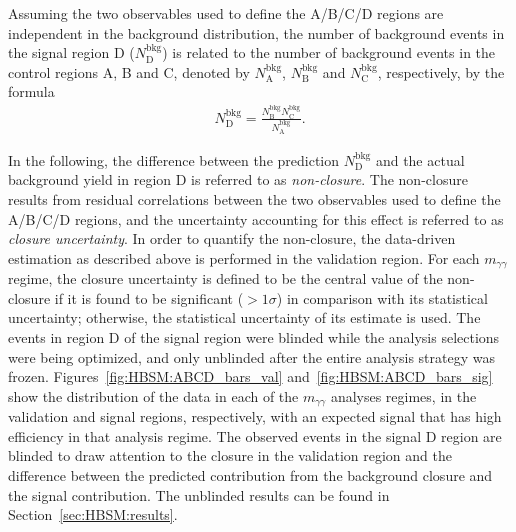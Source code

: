 Assuming the two observables used to define the A/B/C/D regions are independent in the background distribution,
the number of background events in the signal region D ($N^\text{bkg}_\text{D}$) is related to the number
of background events in the control regions A, B and C, denoted by $N^\text{bkg}_\text{A}$, $N^\text{bkg}_\text{B}$
and $N^\text{bkg}_\text{C}$, respectively, by the formula
\begin{align}
N^\text{bkg}_\text{D} = \frac{N^\text{bkg}_\text{B}N^\text{bkg}_\text{C}}{N^\text{bkg}_\text{A}}.
\label{eqn:HBSM:closure}
\end{align}

In the following, the difference between the prediction $N^\text{bkg}_\text{D}$ and the actual background yield in region D 
is referred to as \textit{non-closure}.
The non-closure results from residual correlations between the two observables used to define the A/B/C/D regions,
and the uncertainty accounting for this effect is referred to as \textit{closure uncertainty}.
In order to quantify the non-closure, the data-driven estimation as described above is performed 
in the validation region.
For each $m_{\gamma\gamma}$ regime, the closure uncertainty is defined to be the central value of the non-closure if it is found to be significant ($>1\sigma$) in comparison with its statistical uncertainty; otherwise, the statistical uncertainty of its estimate is used.
The events in region D of the signal region were blinded while the analysis selections were being optimized, and only unblinded after the entire analysis strategy was frozen.
Figures~\ref{fig:HBSM:ABCD_bars_val} and~\ref{fig:HBSM:ABCD_bars_sig} show the distribution of the data in each of the $m_{\gamma\gamma}$ analyses regimes, in the validation and signal regions, respectively, with an expected signal that has high efficiency in that analysis regime.
The observed events in the signal D region are blinded to draw attention to the closure in the validation region and the difference between the predicted contribution from the background closure and the signal contribution.
The unblinded results can be found in Section~\ref{sec:HBSM:results}.

